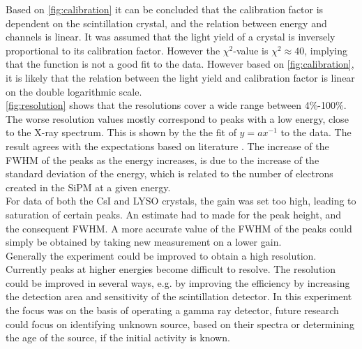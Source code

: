 \documentclass[a4paper, 11pt, table]{article}
\begin{document}
Based on \cref{fig:calibration} it can be concluded that the calibration factor is dependent on the scintillation crystal, and the relation between energy and channels is linear. It was assumed that the light yield of a crystal is inversely proportional to its calibration factor. However the $\chi^2$-value is $\chi^2\approx40$, implying that the function is not a good fit to the data. However based on \cref{fig:calibration}, it is likely that the relation between the light yield and calibration factor is linear on the double logarithmic scale.\\

\cref{fig:resolution} shows that the resolutions cover a wide range between 4\%-100\%. The worse resolution values mostly correspond to peaks with a low energy, close to the X-ray spectrum. This is shown by the the fit of $y=ax^{-1}$ to the data. The result agrees with the expectations based on literature \cite{bloser_2013}. The increase of the FWHM of the peaks as the energy increases, is due to the increase of the standard deviation of the energy, which is related to the number of electrons created in the SiPM at a given energy.\\


For data of both the CsI and LYSO crystals, the gain was set too high, leading to saturation of certain peaks. An estimate had to made for the peak height, and the consequent FWHM. A more accurate value of the FWHM of the peaks could simply be obtained by taking new measurement on a lower gain.\\

Generally the experiment could be improved to obtain a high resolution. Currently peaks at higher energies become difficult to resolve. The resolution could be improved in several ways, e.g. by improving the efficiency by increasing the detection area and sensitivity of the scintillation detector. In this experiment the focus was on the basis of operating a gamma ray detector, future research could focus on identifying unknown source, based on their spectra or determining the age of the source, if the initial activity is known.
\end{document}

